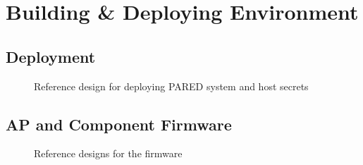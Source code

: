 \section{Building \& Deploying Environment}
\label{sec:build}

\subsection{Deployment}
\label{sec:deploy}

\iflong
\begin{figure}[H]
    \begin{center}
    \end{center}
    \caption{Reference design for deploying PARED system and host secrets}
    \label{fig:build-deployment}
\end{figure}
\fi



\subsection{AP and Component Firmware}
\label{sec:firmware}

\iflong
\begin{figure}[H]
    \begin{center}
    \end{center}
    \caption{Reference designs for the firmware}
    \label{fig:build-car-and-fobs}
\end{figure}
\fi

